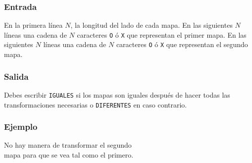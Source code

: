  \subsubsection*{Entrada}
 En la primera línea \(N\), la longitud del lado de cada mapa. En las siguientes \(N\) líneas una cadena de \(N\) caracteres \verb|O| ó \verb|X| que representan el primer mapa. En las siguientes \(N\) líneas una cadena de \(N\) caracteres \verb|O| ó \verb|X| que representan el segundo mapa.
\subsubsection*{Salida}
Debes escribir \verb|IGUALES| si los mapas son iguales después de hacer todas las transformaciones necesarias o \verb|DIFERENTES| en caso contrario.

\subsubsection*{Ejemplo}
\begin{casebox3}
	{No hay manera de transformar el segundo \\mapa para que se vea tal como el primero.}
\end{casebox3}

